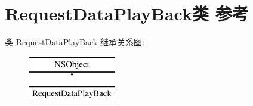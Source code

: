 \hypertarget{interface_request_data_play_back}{}\section{Request\+Data\+Play\+Back类 参考}
\label{interface_request_data_play_back}
类 Request\+Data\+Play\+Back 继承关系图\+:\begin{figure}[H]
\begin{center}
\leavevmode
\includegraphics[height=2.000000cm]{interface_request_data_play_back}
\end{center}
\end{figure}
